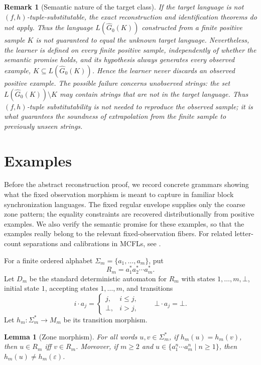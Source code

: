 \documentclass[11pt,a4paper]{article}
\newtheorem{lemma}[theorem]{Lemma}
\newtheorem{remark}[theorem]{Remark}
\theoremstyle{remark}
\newcommand{\eps}{\varepsilon}
\begin{document}
\begin{remark}[Semantic nature of the target class]
If the target language is not \((f,h)\)-tuple-substitutable, the exact
reconstruction and identification theorems do not apply.  Thus the language \(L(\widehat G_0(K))\) constructed from a finite positive
sample \(K\) is not guaranteed to equal the
unknown target language.  Nevertheless, the learner is defined on every finite
positive sample, independently of whether the semantic promise holds, and its
hypothesis always generates every observed example,
\(K\subseteq L(\widehat G_0(K))\).  Hence the learner never discards an observed positive example.  The possible
failure concerns unobserved strings: the set
\(L(\widehat G_0(K))\setminus K\) may contain strings that are not in the target language.  Thus
\((f,h)\)-tuple substitutability is not needed to reproduce the observed
sample; it is what guarantees the soundness of extrapolation from the finite
sample to previously unseen strings.
\end{remark}


\section{Examples}
\label{sec:running-examples}

Before the abstract reconstruction proof, we record concrete grammars showing
what the fixed observation morphism is meant to capture in familiar block
synchronization languages.  The fixed regular envelope supplies only the coarse
zone pattern; the equality constraints are recovered distributionally from
positive examples.  We also verify the semantic promise for these examples, so
that the examples really belong to the relevant fixed-observation fibers.  For
related letter-count separations and calibrations in MCFLs, see
\cite{LehnerLindorfer2020}.

For a finite ordered alphabet \(\Sigma_m=\{a_1,\ldots,a_m\}\), put
\[
  R_m=a_1^*a_2^*\cdots a_m^* .
\]
Let \(D_m\) be the standard deterministic automaton for \(R_m\) with states
\(1,\ldots,m,\bot\), initial state \(1\), accepting states \(1,\ldots,m\), and
transitions
\[
  i\cdot a_j=
  \begin{cases}
    j, & i\le j,\\
    \bot, & i>j,
  \end{cases}
  \qquad
  \bot\cdot a_j=\bot .
\]
Let \(h_m:\Sigma_m^*\to M_m\) be its transition morphism.

\begin{lemma}[Zone morphism]
\label{lem:zone-morphism-basic}
For all words \(u,v\in\Sigma_m^*\), if \(h_m(u)=h_m(v)\), then
\(u\in R_m\) iff \(v\in R_m\).  Moreover, if \(m\ge2\) and
\(u\in \{a_1^n\cdots a_m^n\mid n\ge1\}\), then
\(h_m(u)\ne h_m(\eps)\).
\end{lemma}
\end{document}
